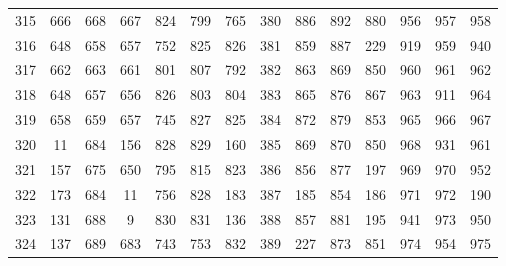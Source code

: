 \begin{apendicesenv}
\begin{table}[H]
\begin{tabular}{@{}ccccccc@{\hspace{1.0cm}}ccccccc@{}}
		315 &  666 &  668 &  667 &  824 &  799 &  765 & 380 &  886 &  892 &  880 &  956 &  957 &  958 \\
		316 &  648 &  658 &  657 &  752 &  825 &  826 & 381 &  859 &  887 &  229 &  919 &  959 &  940 \\
		317 &  662 &  663 &  661 &  801 &  807 &  792 & 382 &  863 &  869 &  850 &  960 &  961 &  962 \\
		318 &  648 &  657 &  656 &  826 &  803 &  804 & 383 &  865 &  876 &  867 &  963 &  911 &  964 \\
		319 &  658 &  659 &  657 &  745 &  827 &  825 & 384 &  872 &  879 &  853 &  965 &  966 &  967 \\
		320 &   11 &  684 &  156 &  828 &  829 &  160 & 385 &  869 &  870 &  850 &  968 &  931 &  961 \\
		321 &  157 &  675 &  650 &  795 &  815 &  823 & 386 &  856 &  877 &  197 &  969 &  970 &  952 \\
		322 &  173 &  684 &   11 &  756 &  828 &  183 & 387 &  185 &  854 &  186 &  971 &  972 &  190 \\
		323 &  131 &  688 &    9 &  830 &  831 &  136 & 388 &  857 &  881 &  195 &  941 &  973 &  950 \\
		324 &  137 &  689 &  683 &  743 &  753 &  832 & 389 &  227 &  873 &  851 &  974 &  954 &  975 \\
		\bottomrule
	\end{tabular}
\end{table}


\end{apendicesenv}
